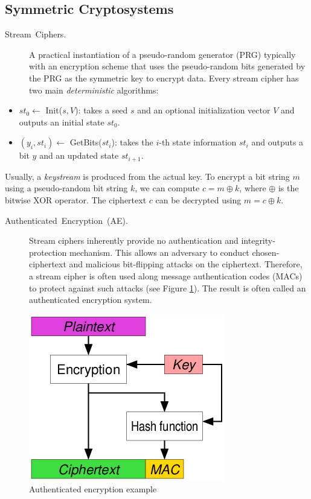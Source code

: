 \documentclass[11pt]{article}
\theoremstyle{plain}
\begin{document}
\subsection{Symmetric Cryptosystems}
\begin{description}
	\item [{Stream~Ciphers.}] A practical instantiation of a pseudo-random
	generator (PRG) typically with an encryption scheme that uses the
	pseudo-random bits generated by the PRG as the symmetric key to encrypt
	data. Every stream cipher has two main \emph{deterministic} algorithms:
\end{description}
\begin{itemize}
	\item $st_{0}\gets$ Init($s,V$): takes a seed $s$ and an optional initialization
	vector $V$ and outputs an initial state $st_{0}$.
	\item $(y_{i},st_{i})\gets$ GetBits($st_{i}$): takes the $i$-th state
	information $st_{i}$ and outputs a bit $y$ and an updated state
	$st_{i+1}$. 
\end{itemize}
Usually, a \emph{keystream }is produced from the actual key. To encrypt
a bit string $m$ using a pseudo-random bit string $k$, we can compute
$c=m\oplus k$, where $\oplus$ is the bitwise XOR operator. The ciphertext
$c$ can be decrypted using $m=c\oplus k$. 
\begin{description}
	\item [{Authenticated~Encryption~(AE).}] Stream ciphers inherently provide
	no authentication and integrity-protection mechanism. This allows
	an adversary to conduct chosen-ciphertext and malicious bit-flipping
	attacks on the ciphertext. Therefore, a stream cipher is often used
	along message authentication codes (MACs) to protect against such
	attacks (see Figure \ref{fig:ae}). The result is often called an
	authenticated encryption system.
\end{description}
\begin{figure}
	\begin{centering}
		\includegraphics[scale=0.7]{ae}
		\par\end{centering}
	\caption{Authenticated encryption example}
	\label{fig:ae}
\end{figure}
\end{document}
